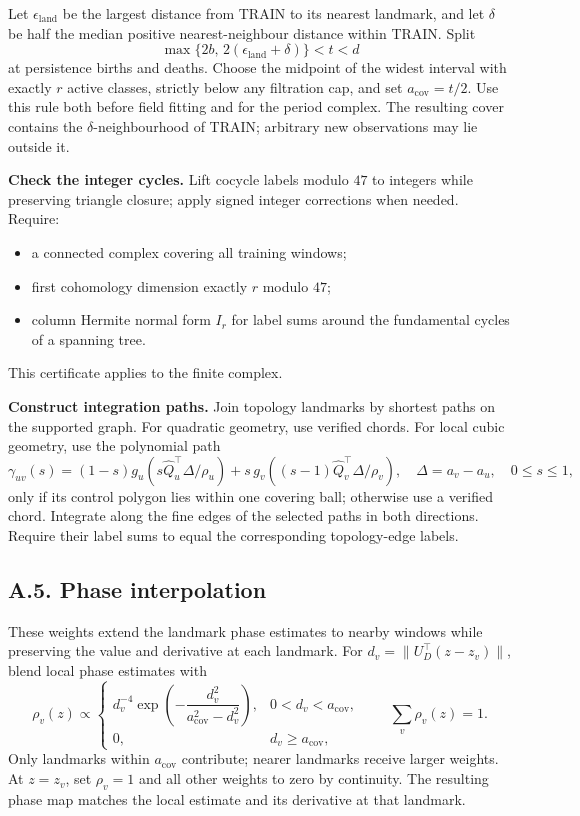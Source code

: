 \documentclass[11pt,a4paper]{article}
\begin{document}
Let $\epsilon_{\mathrm{land}}$ be the largest distance from TRAIN to its
nearest landmark, and let $\delta$ be half the median positive nearest-neighbour
distance within TRAIN. Split
\[
\max\{2b,\,2(\epsilon_{\mathrm{land}}+\delta)\}<t<d
\]
at persistence births and deaths. Choose the midpoint of the widest
interval with exactly $r$ active classes, strictly below any filtration
cap, and set $a_{\mathrm{cov}}=t/2$.
Use this rule both before field fitting and for the period complex.
The resulting cover contains the $\delta$-neighbourhood of TRAIN;
arbitrary new observations may lie outside it.

\textbf{Check the integer cycles.}
Lift cocycle labels modulo $47$ to integers while preserving triangle
closure; apply signed integer corrections when needed. Require:
\begin{itemize}
\setlength{\itemsep}{1pt}
\item a connected complex covering all training windows;
\item first cohomology dimension exactly $r$ modulo $47$;
\item column Hermite normal form $I_r$ for label sums around the
fundamental cycles of a spanning tree.
\end{itemize}
This certificate applies to the finite complex.

\textbf{Construct integration paths.}
Join topology landmarks by shortest paths on the supported graph.
For quadratic geometry, use verified chords. For local cubic geometry,
use the polynomial path
\[
\gamma_{uv}(s)=
(1-s)g_u\!\left(s\widehat Q_u^\top\Delta/\rho_u\right)
+s\,g_v\!\left((s-1)\widehat Q_v^\top\Delta/\rho_v\right),
\quad \Delta=a_v-a_u,\quad 0\le s\le1,
\]
only if its control polygon lies within one covering ball; otherwise use
a verified chord. Integrate along the fine edges of the selected paths
in both directions. Require their label sums to equal the corresponding
topology-edge labels.

\subsection*{A.5. Phase interpolation}
\label{app:phase-weights}
These weights extend the landmark phase estimates to nearby windows
while preserving the value and derivative at each landmark.
For $d_v=\|U_D^\top(z-z_v)\|$, blend local phase estimates with
\[
\rho_v(z)\propto
\begin{cases}
d_v^{-4}\exp\!\left(-\dfrac{d_v^2}{a_{\mathrm{cov}}^2-d_v^2}\right),
&0<d_v<a_{\mathrm{cov}},\\
0,&d_v\ge a_{\mathrm{cov}},
\end{cases}
\qquad \sum_v\rho_v(z)=1.
\]
Only landmarks within $a_{\mathrm{cov}}$ contribute; nearer landmarks
receive larger weights. At $z=z_v$, set $\rho_v=1$ and all other weights
to zero by continuity. The resulting phase map matches the local estimate
and its derivative at that landmark.
\end{document}
